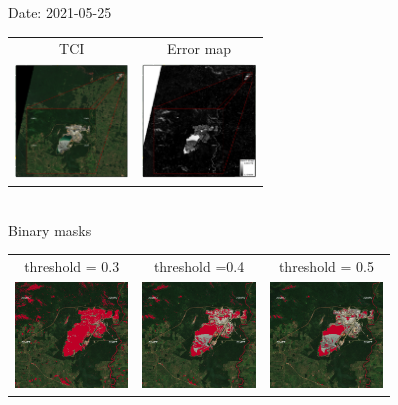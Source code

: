 \documentclass{beamer}
\begin{document}
\begin{frame}{Date: 2021-05-25}
\centering
    \begin{tabular}{cc}
    TCI & Error map\\
    \includegraphics[width=3cm]{Figures/v3/20210525/TCI/TCI_zoom1.pdf}
    &
    \includegraphics[width=3cm]{Figures/v3/20210525/error/error_zoom1.pdf}
\end{tabular}
\\
   \centering
    Binary masks
    \begin{tabular}{ccc}
        threshold = 0.3  & threshold =0.4 &  threshold = 0.5 \\
    \includegraphics[width=3cm]{Figures/v3/20210525/umbral_03/zoom1.png}
    &
    \includegraphics[width=3cm]{Figures/v3/20210525/umbral_04/zoom1.png}
    &
    \includegraphics[width=3cm]{Figures/v3/20210525/umbral_05/zoom1.png}
    \end{tabular}
\end{frame}
\end{document}
